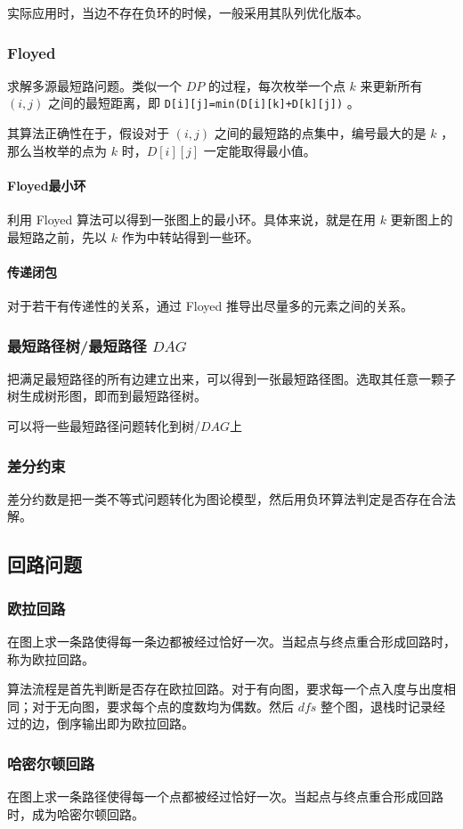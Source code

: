 \documentclass[UTF-8]{ctexart}
\begin{document}
				实际应用时，当边不存在负环的时候，一般采用其队列优化版本。
				\subsubsection{Floyed}
				求解多源最短路问题。类似一个 $DP$ 的过程，每次枚举一个点 $k$ 来更新所有 $(i,j)$ 之间的最短距离，即 \texttt{D[i][j]=min(D[i][k]+D[k][j])} 。
				
				其算法正确性在于，假设对于 $(i,j)$ 之间的最短路的点集中，编号最大的是 $k$ ，那么当枚举的点为 $k$ 时，$D[i][j]$ 一定能取得最小值。
				\paragraph{Floyed最小环} 利用 Floyed 算法可以得到一张图上的最小环。具体来说，就是在用 $k$ 更新图上的最短路之前，先以 $k$ 作为中转站得到一些环。
				\paragraph{传递闭包} 对于若干有传递性的关系，通过 Floyed 推导出尽量多的元素之间的关系。
				\subsubsection{最短路径树/最短路径 $DAG$}
				把满足最短路径的所有边建立出来，可以得到一张最短路径图。选取其任意一颗子树生成树形图，即而到最短路径树。
				
				可以将一些最短路径问题转化到树/$DAG$上
				\subsubsection{差分约束}
				差分约数是把一类不等式问题转化为图论模型，然后用负环算法判定是否存在合法解。
				\subsection{回路问题}
				\subsubsection{欧拉回路}
				在图上求一条路使得每一条边都被经过恰好一次。当起点与终点重合形成回路时，称为欧拉回路。
				
				算法流程是首先判断是否存在欧拉回路。对于有向图，要求每一个点入度与出度相同；对于无向图，要求每个点的度数均为偶数。然后 $dfs$ 整个图，退栈时记录经过的边，倒序输出即为欧拉回路。
				\subsubsection{哈密尔顿回路}
				在图上求一条路径使得每一个点都被经过恰好一次。当起点与终点重合形成回路时，成为哈密尔顿回路。
				
\end{document}
